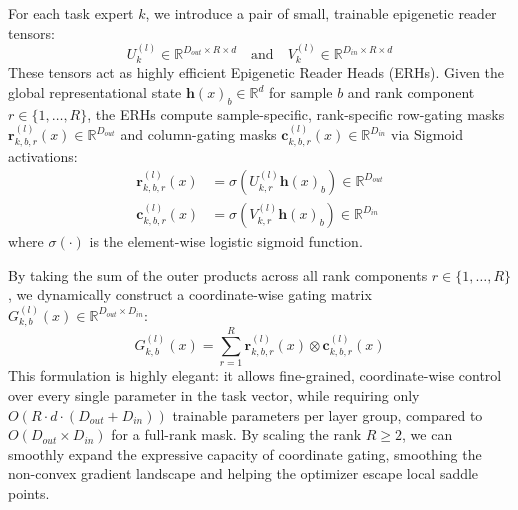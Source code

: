 For each task expert $k$, we introduce a pair of small, trainable epigenetic reader tensors:
\begin{equation}
    U_k^{(l)} \in \mathbb{R}^{D_{out} \times R \times d} \quad \text{and} \quad V_k^{(l)} \in \mathbb{R}^{D_{in} \times R \times d}
\end{equation}
These tensors act as highly efficient Epigenetic Reader Heads (ERHs). Given the global representational state $\mathbf{h}(x)_b \in \mathbb{R}^d$ for sample $b$ and rank component $r \in \{1, \dots, R\}$, the ERHs compute sample-specific, rank-specific row-gating masks $\mathbf{r}_{k, b, r}^{(l)}(x) \in \mathbb{R}^{D_{out}}$ and column-gating masks $\mathbf{c}_{k, b, r}^{(l)}(x) \in \mathbb{R}^{D_{in}}$ via Sigmoid activations:
\begin{align}
    \mathbf{r}_{k, b, r}^{(l)}(x) &= \sigma\left( U_{k, r}^{(l)} \mathbf{h}(x)_b \right) \in \mathbb{R}^{D_{out}} \\
    \mathbf{c}_{k, b, r}^{(l)}(x) &= \sigma\left( V_{k, r}^{(l)} \mathbf{h}(x)_b \right) \in \mathbb{R}^{D_{in}}
\end{align}
where $\sigma(\cdot)$ is the element-wise logistic sigmoid function. 

By taking the sum of the outer products across all rank components $r \in \{1, \dots, R\}$, we dynamically construct a coordinate-wise gating matrix $G_{k, b}^{(l)}(x) \in \mathbb{R}^{D_{out} \times D_{in}}$:
\begin{equation}
    G_{k, b}^{(l)}(x) = \sum_{r=1}^R \mathbf{r}_{k, b, r}^{(l)}(x) \otimes \mathbf{c}_{k, b, r}^{(l)}(x)
\end{equation}
This formulation is highly elegant: it allows fine-grained, coordinate-wise control over every single parameter in the task vector, while requiring only $O(R \cdot d \cdot (D_{out} + D_{in}))$ trainable parameters per layer group, compared to $O(D_{out} \times D_{in})$ for a full-rank mask. By scaling the rank $R \ge 2$, we can smoothly expand the expressive capacity of coordinate gating, smoothing the non-convex gradient landscape and helping the optimizer escape local saddle points.

